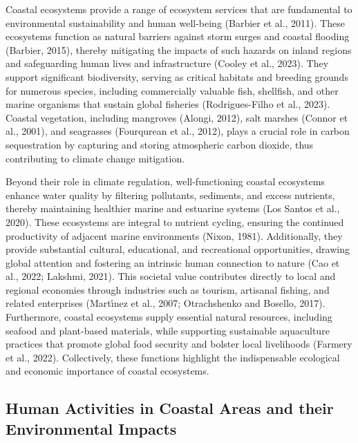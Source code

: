 \documentclass[
  letterpaper,
  11pt,
  english,
  singlespacing,
  headsepline]{MastersDoctoralThesis}
\begin{document}
\begin{spacing}{1.5}
\begin{figure}
\end{figure}%

Coastal ecosystems provide a range of ecosystem services that are
fundamental to environmental sustainability and human well-being
(Barbier et al., 2011). These ecosystems function as natural barriers
against storm surges and coastal flooding (Barbier, 2015), thereby
mitigating the impacts of such hazards on inland regions and
safeguarding human lives and infrastructure (Cooley et al., 2023). They
support significant biodiversity, serving as critical habitats and
breeding grounds for numerous species, including commercially valuable
fish, shellfish, and other marine organisms that sustain global
fisheries (Rodrigues-Filho et al., 2023). Coastal vegetation, including
mangroves (Alongi, 2012), salt marshes (Connor et al., 2001), and
seagrasses (Fourqurean et al., 2012), plays a crucial role in carbon
sequestration by capturing and storing atmospheric carbon dioxide, thus
contributing to climate change mitigation.

Beyond their role in climate regulation, well-functioning coastal
ecosystems enhance water quality by filtering pollutants, sediments, and
excess nutrients, thereby maintaining healthier marine and estuarine
systems (Los Santos et al., 2020). These ecosystems are integral to
nutrient cycling, ensuring the continued productivity of adjacent marine
environments (Nixon, 1981). Additionally, they provide substantial
cultural, educational, and recreational opportunities, drawing global
attention and fostering an intrinsic human connection to nature (Cao et
al., 2022; Lakshmi, 2021). This societal value contributes directly to
local and regional economies through industries such as tourism,
artisanal fishing, and related enterprises (Martı́nez et al., 2007;
Otrachshenko and Bosello, 2017). Furthermore, coastal ecosystems supply
essential natural resources, including seafood and plant-based
materials, while supporting sustainable aquaculture practices that
promote global food security and bolster local livelihoods (Farmery et
al., 2022). Collectively, these functions highlight the indispensable
ecological and economic importance of coastal ecosystems.

\subsection{Human Activities in Coastal Areas and their Environmental
Impacts}\label{human-activities-in-coastal-areas-and-their-environmental-impacts}


\end{spacing}
\end{document}
